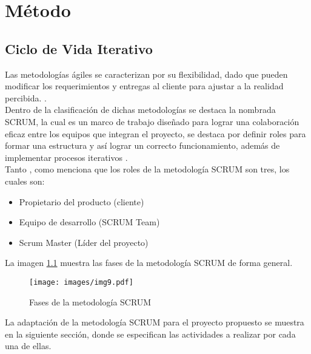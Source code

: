 \chapter{Método}
\label{chap:método_ciclo}

\section{Ciclo de Vida Iterativo}
Las metodologías ágiles se caracterizan por su flexibilidad, dado que pueden modificar los requerimientos y entregas al cliente para ajustar a la realidad percibida. \citep{bib14}. \\

Dentro de la clasificación de dichas metodologías se destaca la nombrada SCRUM, la cual es un marco de trabajo diseñado para lograr una colaboración eficaz entre los equipos que integran el proyecto, se destaca por definir roles para formar una estructura y así lograr un correcto funcionamiento, además de implementar procesos iterativos \citep{bib14}.\\

Tanto \citet[p. 16]{bib17} , como \citep{bib15} menciona que los roles de la metodología SCRUM son tres, los cuales son:

\begin{itemize}
    \item Propietario del producto (cliente)
    \item Equipo de desarrollo (SCRUM Team)
    \item Scrum Master (Líder del proyecto)
\end{itemize}


La imagen \ref{fig:scrum} muestra las fases de la metodología SCRUM de forma general.

\begin{figure}[!ht]
    \begin{center}
        \texttt{[image: images/img9.pdf]}
    \end{center}
    \caption{Fases de la metodología SCRUM \citep{bib20}}
    \label{fig:scrum}
\end{figure}

La adaptación de la metodología SCRUM para el proyecto propuesto se muestra en la siguiente sección, donde se especifican las actividades a realizar por cada una de ellas. \\

